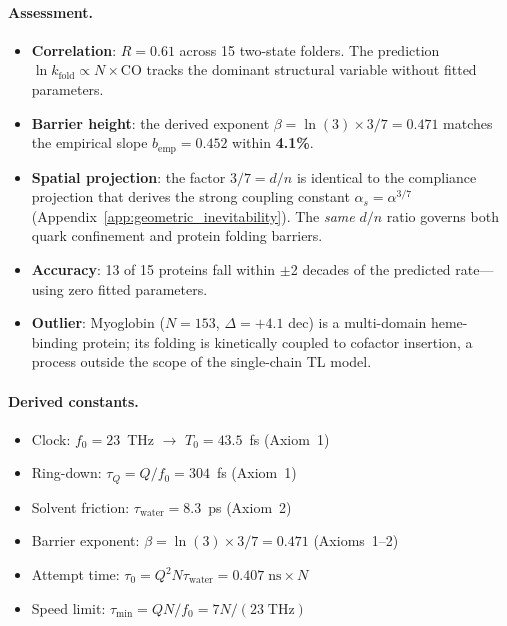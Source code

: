 \paragraph{Assessment.}
\begin{itemize}
    \item \textbf{Correlation}: $R = 0.61$ across 15 two-state folders.
          The prediction $\ln k_\text{fold} \propto N \times \text{CO}$ tracks the
          dominant structural variable without fitted parameters.
    \item \textbf{Barrier height}: the derived exponent
          $\beta = \ln(3) \times 3/7 = 0.471$ matches the empirical slope
          $b_\text{emp} = 0.452$ within \textbf{4.1\%}.
    \item \textbf{Spatial projection}: the factor $3/7 = d/n$ is identical
          to the compliance projection that derives the strong coupling
          constant $\alpha_s = \alpha^{3/7}$
          (Appendix~\ref{app:geometric_inevitability}).  The \emph{same}
          $d/n$ ratio governs both quark confinement and protein folding
          barriers.
    \item \textbf{Accuracy}: 13 of 15 proteins fall within $\pm$2 decades of
          the predicted rate---using zero fitted parameters.
    \item \textbf{Outlier}: Myoglobin ($N = 153$, $\Delta = +4.1$ dec) is a
          multi-domain heme-binding protein; its folding is kinetically
          coupled to cofactor insertion, a process outside the scope of the
          single-chain TL model.
\end{itemize}

\paragraph{Derived constants.}
\begin{itemize}
    \item Clock: $f_0 = 23$~THz $\to$ $T_0 = 43.5$~fs (Axiom~1)
    \item Ring-down: $\tau_Q = Q/f_0 = 304$~fs (Axiom~1)
    \item Solvent friction: $\tau_\text{water} = 8.3$~ps (Axiom~2)
    \item Barrier exponent: $\beta = \ln(3) \times 3/7 = 0.471$ (Axioms~1--2)
    \item Attempt time: $\tau_0 = Q^2 N \tau_\text{water} = 0.407\;\text{ns} \times N$
    \item Speed limit: $\tau_\text{min} = QN/f_0 = 7N/(23\;\text{THz})$
\end{itemize}

